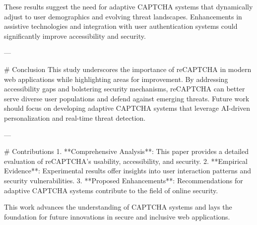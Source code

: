 These results suggest the need for adaptive CAPTCHA systems that dynamically adjust to user demographics and evolving threat landscapes. Enhancements in assistive technologies and integration with user authentication systems could significantly improve accessibility and security.

---

# Conclusion
This study underscores the importance of reCAPTCHA in modern web applications while highlighting areas for improvement. By addressing accessibility gaps and bolstering security mechanisms, reCAPTCHA can better serve diverse user populations and defend against emerging threats. Future work should focus on developing adaptive CAPTCHA systems that leverage AI-driven personalization and real-time threat detection.

---

# Contributions
1. **Comprehensive Analysis**: This paper provides a detailed evaluation of reCAPTCHA's usability, accessibility, and security.
2. **Empirical Evidence**: Experimental results offer insights into user interaction patterns and security vulnerabilities.
3. **Proposed Enhancements**: Recommendations for adaptive CAPTCHA systems contribute to the field of online security.

This work advances the understanding of CAPTCHA systems and lays the foundation for future innovations in secure and inclusive web applications.